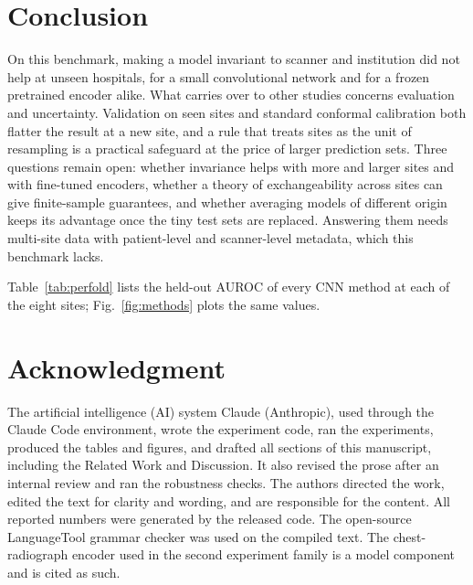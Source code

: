 \documentclass[journal]{IEEEtran}
\newcommand{\tabnote}[1]{\par\vspace{3pt}{\footnotesize\raggedright #1\par}}
\newcommand{\tabin}[1]{}
\begin{document}
\section{Conclusion}
On this benchmark, making a model invariant to scanner and institution did not help at unseen hospitals, for a small convolutional network and for a frozen pretrained encoder alike. What carries over to other studies concerns evaluation and uncertainty. Validation on seen sites and standard conformal calibration both flatter the result at a new site, and a rule that treats sites as the unit of resampling is a practical safeguard at the price of larger prediction sets. Three questions remain open: whether invariance helps with more and larger sites and with fine-tuned encoders, whether a theory of exchangeability across sites can give finite-sample guarantees, and whether averaging models of different origin keeps its advantage once the tiny test sets are replaced. Answering them needs multi-site data with patient-level and scanner-level metadata, which this benchmark lacks.

\label{app:perfold}
Table~\ref{tab:perfold} lists the held-out AUROC of every CNN method at each of the eight sites; Fig.~\ref{fig:methods} plots the same values.

\begin{table}[!tb]\centering\footnotesize
\caption{Held-Out AUROC per Site}\label{tab:perfold}
\tabin{perfold.tex}
\tabnote{Two-seed mean. Superscripts: d = development fold, c = confirmation fold.}
\end{table}

\section*{Acknowledgment}
The artificial intelligence (AI) system Claude (Anthropic), used through the Claude Code environment, wrote the experiment code, ran the experiments, produced the tables and figures, and drafted all sections of this manuscript, including the Related Work and Discussion. It also revised the prose after an internal review and ran the robustness checks. The authors directed the work, edited the text for clarity and wording, and are responsible for the content. All reported numbers were generated by the released code. The open-source LanguageTool grammar checker was used on the compiled text. The chest-radiograph encoder used in the second experiment family is a model component and is cited as such.



\end{document}
